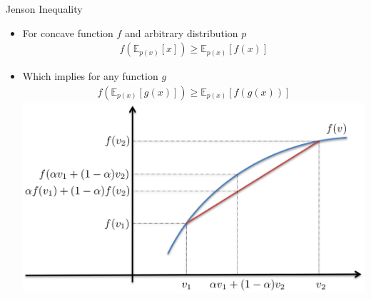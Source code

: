 \documentclass[compress]{beamer}
\newcommand{\expects}[2]{\mathbb{E}_{#1} \left[ #2 \right]}
\begin{document}
\begin{frame}[t]{Jenson Inequality}
    \begin{itemize}
        \item For concave function $f$ and arbitrary distribution $p$
            \begin{align*}
                f(\expects{p(x)}{x})\ge \expects{p(x)}{f(x)}
            \end{align*}
        \item Which implies for any function $g$
            \begin{align*}
                f(\expects{p(x)}{g(x)})\ge \expects{p(x)}{f(g(x))}
            \end{align*}
        \includegraphics[height=.5\textheight]{jenson}
    \end{itemize}
\end{frame}
\end{document}
